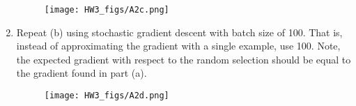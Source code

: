 \documentclass{article}
\begin{document}
\begin{aprob}
\begin{enumerate}
        \begin{figure}[htp] 
        \centering
        \vspace*{-0.1in}
        \texttt{[image: HW3\_figs/A2c.png]}
        \label{figs:A2c.png}
        \end{figure}
        
        \item {} Repeat (b) using stochastic gradient descent with batch size of 100. That is, instead of approximating the gradient with a single example, use 100. Note, the expected gradient with respect to the random selection should be equal to the gradient found in part (a).
        
        \begin{figure}[htp] 
        \centering
        \vspace*{-0.1in}
        \texttt{[image: HW3\_figs/A2d.png]}
        \label{figs:A2d.png}
        \end{figure}
        
    \end{enumerate}
    
\end{aprob}
\end{document}
